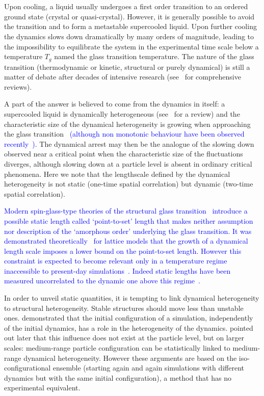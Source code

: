 \section*{}

Upon cooling, a liquid usually undergoes a first order transition to an ordered ground state (crystal or quasi-crystal). However, it is generally possible to avoid the transition and to form a metastable supercooled liquid. Upon further cooling the dynamics slows down dramatically by many orders of magnitude, leading to the impossibility to equilibrate the system in the experimental time scale below a temperature $T_g$ named the glass transition temperature. The nature of the glass transition (thermodynamic or kinetic, structural or purely dynamical) is still a matter of debate after decades of intensive research (see~\citep{cavagna2009supercooled,BerthierR} for comprehensive reviews).

A part of the answer is believed to come from the dynamics in itself: a supercooled liquid is dynamically heterogeneous (see~\citep{BerthierR} for a review) and the characteristic size of the dynamical heterogeneity is growing when approaching the glass transition~\citep{yamamoto1998,Donati1999a} \textcolor{blue}{(although non monotonic behaviour have been observed recently~\cite{Kob2011})}. The dynamical arrest may then be the analogue of the slowing down observed near a critical point when the characteristic size of the fluctuations diverges, although slowing down at a particle level is absent in ordinary critical phenomena. Here we note that the lengthscale defined by the dynamical heterogeneity is not static (one-time spatial correlation) but dynamic (two-time spatial correlation). 

\textcolor{blue}{Modern spin-glass-type theories of the structural glass transition~\cite{lubchenko2007, Biroli2008, Parisi2010} introduce a possible static length called `point-to-set' length that makes neither assumption nor description of the `amorphous order' underlying the glass transition. It was demonstrated theoretically~\cite{Montanari2006} for lattice models that the growth of a dynamical length scale imposes a lower bound on the point-to-set length. However this constraint is expected to become relevant only in a temperature regime inaccessible to present-day simulations~\cite{Kob2011}. Indeed static lengths have been measured  uncorrelated to the dynamic one above this regime~\cite{Charbonneau}.}

In order to unveil static quantities, it is tempting to link dynamical heterogeneity to structural heterogeneity. Stable structures should move less than unstable ones. \citet{Widmer-Cooper2005} demonstrated that the initial configuration of a simulation, independently of the initial dynamics, has a role in the heterogeneity of the dynamics. \citet{Berthier2007} pointed out later that this influence does not exist at the particle level, but on larger scales: medium-range particle configuration can be statistically linked to medium-range dynamical heterogeneity. However these arguments are based on the iso-configurational ensemble (starting again and again simulations with different dynamics but with the same initial configuration), a method that has no experimental equivalent.

